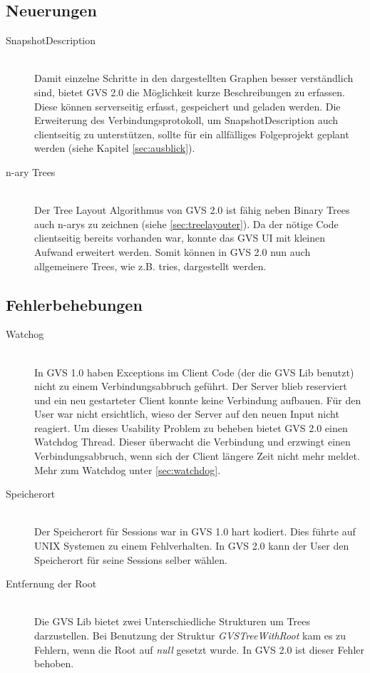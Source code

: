 \documentclass[11pt,a4paper,english,oneside]{book}
\numberwithin{equation}{chapter}
\begin{document}
	\subsection{Neuerungen} \label{ssec:neuerungen}
	\begin{description}
		\item[SnapshotDescription] \hfill \\ 
		Damit einzelne Schritte in den dargestellten Graphen besser verständlich sind, bietet GVS 2.0 die Möglichkeit kurze Beschreibungen zu erfassen. Diese können serverseitig erfasst, gespeichert und geladen werden. Die Erweiterung des Verbindungsprotokoll, um SnapshotDescription auch clientseitig zu unterstützen, sollte für ein allfälliges Folgeprojekt geplant werden (siehe Kapitel \ref{sec:ausblick}).
		\item[n-ary Trees] \hfill \\
		Der Tree Layout Algorithmus von GVS 2.0 ist fähig neben Binary Trees auch \glspl{n-ary} zu zeichnen (siehe \ref{sec:treelayouter}). Da der nötige Code clientseitig bereits vorhanden war, konnte das GVS UI mit kleinen Aufwand erweitert werden. Somit können in GVS 2.0 nun auch allgemeinere Trees, wie z.B. \glspl{trie}, dargestellt werden.
	\end{description}
	
	\subsection{Fehlerbehebungen}
	\begin{description}
		\item[Watchog] \hfill \\ 
		In GVS 1.0 haben Exceptions im Client Code (der die GVS Lib benutzt) nicht zu einem Verbindungsabbruch geführt. Der Server blieb reserviert und ein neu gestarteter Client konnte keine Verbindung aufbauen. Für den User war nicht ersichtlich, wieso der Server auf den neuen Input nicht reagiert. Um dieses Usability Problem zu beheben bietet GVS 2.0 einen Watchdog Thread. Dieser überwacht die Verbindung und erzwingt einen Verbindungsabbruch, wenn sich der Client längere Zeit nicht mehr meldet. Mehr zum Watchdog unter \ref{sec:watchdog}.
		\item[Speicherort]  \hfill \\ Der Speicherort für Sessions war in GVS 1.0 hart kodiert. Dies führte auf UNIX Systemen zu einem Fehlverhalten. In GVS 2.0 kann der User den Speicherort für seine Sessions selber wählen.
		\item[Entfernung der Root] \hfill \\ Die GVS Lib bietet zwei Unterschiedliche Strukturen um Trees darzustellen. Bei Benutzung der Struktur \textit{GVSTreeWithRoot} kam es zu Fehlern, wenn die Root auf \textit{null} gesetzt wurde. In GVS 2.0 ist dieser Fehler behoben.
	\end{description}
\end{document}
